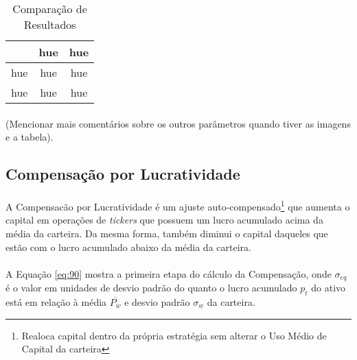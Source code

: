 \begin{table}[h!]
    \begin{center}
        \begin{tabular}{ c|cc }
            & hue & hue \\
            \hline
            hue & hue & hue \\
            hue & hue & hue \\
        \end{tabular}
        \caption{Comparação de Resultados}
        \label{tab:6}
    \end{center}
\end{table}

\paragraph{} (Mencionar mais comentários sobre os outros parâmetros quando tiver as imagens e a tabela).



\subsection{Compensação por Lucratividade}
\label{profit_comp}

\paragraph{} A Compensacão por Lucratividade é um ajuste auto-compensado\footnote{Realoca capital dentro da própria estratégia sem alterar o Uso Médio de Capital da carteira} que aumenta o capital em operações de \textit{tickers} que possuem um lucro acumulado acima da média da carteira. Da mesma forma, também diminui o capital daqueles que estão com o lucro acumulado abaixo da média da carteira.

\paragraph{} A Equação \ref{eq:90} mostra a primeira etapa do cálculo da Compensação, onde \begin{math} \sigma_{eq} \end{math} é o valor em unidades de desvio padrão do quanto o lucro acumulado \begin{math} p_t \end{math} do ativo está em relação à média \begin{math} \overline{P_w} \end{math} e desvio padrão \begin{math} \sigma_w \end{math} da carteira.


